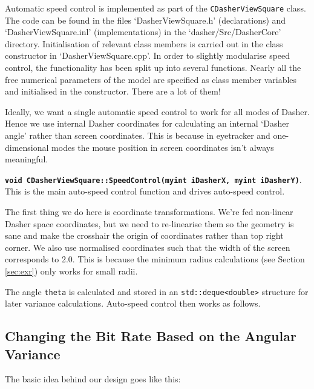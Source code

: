 \documentclass[a4paper,11pt,notitlepage]{article}
\begin{document}
Automatic speed control is implemented as part of the
\texttt{CDasherViewSquare} class. The code can be found in the files
`DasherViewSquare.h' (declarations) and `DasherViewSquare.inl'
(implementations) in the `dasher/Src/DasherCore'
directory. Initialisation of relevant class members is carried out in
the class constructor in `DasherViewSquare.cpp'. In order to slightly
modularise speed control, the functionality has been split up into
several functions. Nearly all the free numerical parameters of the
model are specified as class member variables and initialised in the
constructor. There are a lot of them!

Ideally, we want a single automatic speed control to work for all
modes of Dasher. Hence we use internal Dasher coordinates for
calculating an internal `Dasher angle' rather than screen
coordinates. This is because in eyetracker and one-dimensional modes
the mouse position in screen coordinates isn't always meaningful.

\textbf{\texttt{void CDasherViewSquare::SpeedControl(myint iDasherX,
myint iDasherY)}}. This is the main auto-speed control function and
drives auto-speed control.

The first thing we do here is coordinate transformations. We're fed
non-linear Dasher space coordinates, but we need to re-linearise them
so the geometry is sane and make the crosshair the origin of
coordinates rather than top right corner. We also use normalised
coordinates such that the width of the screen corresponds to 2.0. This
is because the minimum radius calculations (see Section \ref{sec:exr})
only works for small radii.


The angle \texttt{theta} is calculated and stored in an
\texttt{std::deque<double>} structure for later variance
calculations. Auto-speed control then works as follows.

\subsection{Changing the Bit Rate Based on the Angular Variance}\label{sec:chng}

The basic idea behind our design goes like this:
\end{document}
